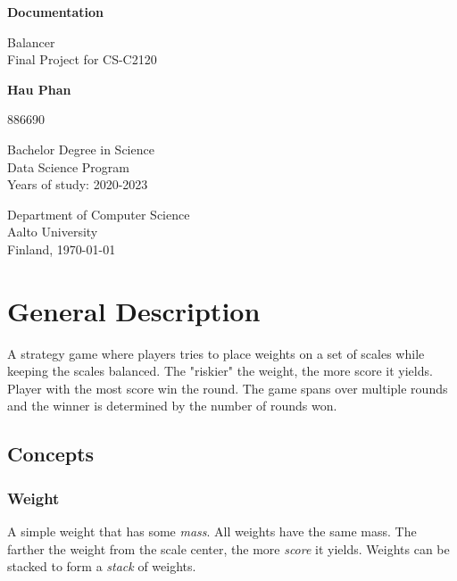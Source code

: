\documentclass[12pt]{article}
\begin{document}
\begin{titlepage}
    \thispagestyle{fancy}
    \begin{center}
        \vspace*{1cm}
            
        \huge
        \textbf{Documentation}
            
        \vspace{0.5cm}
        \Large
        Balancer\\

        \normalsize
        \vspace{0.5cm}
        Final Project for CS-C2120
            
        \vspace{1.5cm}
            
        \textbf{Hau Phan}

        \normalsize
        886690
            
        \vfill

            
        Bachelor Degree in Science\\
        Data Science Program\\
        Years of study: 2020-2023
            
        \vspace{0.8cm}
            
        \normalsize
        Department of Computer Science\\
        Aalto University\\
        Finland, \today
    \end{center}
\end{titlepage}
\newpage

\tableofcontents
{}
\newpage

\section{General Description}
A strategy game where players tries to place weights on a set of scales while
keeping the scales balanced. The "riskier" the weight, the more score it yields.
Player with the most score win the round. The game spans over multiple rounds
and the winner is determined by the number of rounds won.
\subsection{Concepts}
\subsubsection{Weight}
A simple weight that has some \textit{mass}. All weights have the same mass. The
farther the weight from the scale center, the more \textit{score} it yields.
Weights can be stacked to form a \textit{stack} of weights.
\end{document}

